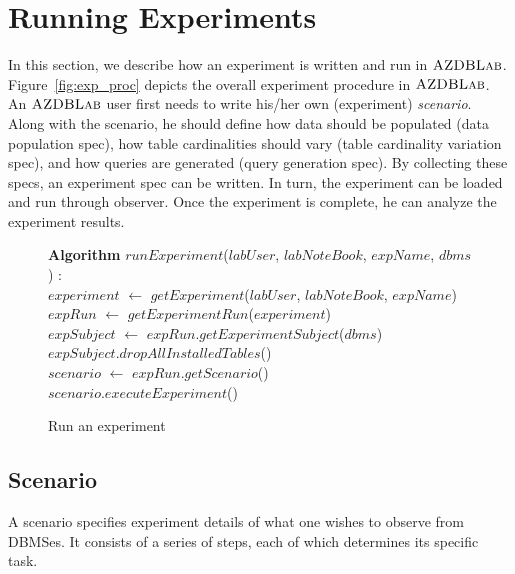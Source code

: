 \documentclass[conference]{IEEEtran}
\def\azdb{\hbox{\sc AZDBLab}}
\begin{document}
\section{Running Experiments}\label{sec:running_exp} 
In this section, we describe how an experiment is written and run in $\azdb$. 
Figure~\ref{fig:exp_proc} depicts the overall experiment procedure in $\azdb$.  
An $\azdb$ user first needs to write his/her own (experiment) {\em scenario}. 
Along with the scenario, he should define how data should be populated 
(data population spec), how table cardinalities should vary (table cardinality variation spec), 
and how queries are generated (query generation spec). 
By collecting these specs, an experiment spec can be written. 
In turn, the experiment can be loaded and run through observer. Once the experiment is 
complete, he can analyze the experiment results. 

\begin{figure}[t]
\begin{center}
\begin{algorithmic}
{\bf Algorithm} $runExperiment$($labUser$, $labNoteBook$, $expName$, $dbms$) : \\
	\STATE $experiment$ $\leftarrow$ $getExperiment$($labUser$, $labNoteBook$, $expName$)\\
    \STATE $expRun$ $\leftarrow$ $getExperimentRun$($experiment$)\\
    \STATE $expSubject$ $\leftarrow$ $expRun$.$getExperimentSubject$($dbms$) \\
    \STATE $expSubject$.$dropAllInstalledTables$()\\
    \STATE $scenario$ $\leftarrow$ $expRun$.$getScenario$()\\ 
    \STATE $scenario$.$executeExperiment$()\\
\end{algorithmic}
\caption{Run an experiment\label{alg:run_exp}}
\end{center}
\end{figure}

\subsection{Scenario} 
A scenario specifies experiment details of what one wishes to observe from DBMSes. 
It consists of a series of steps, each of which determines its specific task.
\end{document}

